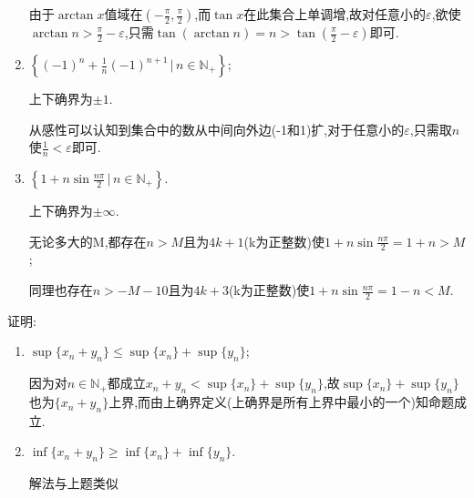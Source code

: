 \documentclass[cn,chinese,fontset]{elegantbook}
\begin{document}
\begin{exercise}
\begin{enumerate}
\begin{solution}
                        由于$\arctan x$值域在$\left(-\frac{\pi}{2},\frac{\pi}{2}\right)$,而$\tan x$在此集合上单调增,故对任意小的$\varepsilon$,欲使$\arctan n>\frac{\pi}{2}-\varepsilon$,只需$\tan(\arctan n)=n>\tan\left(\frac{\pi}{2}-\varepsilon\right)$即可.
            
                    \end{solution}
                    \item $\left\{(-1)^n+\frac{1}{n}(-1)^{n+1}\,\biggl\lvert\, n\in \mathbb{N}_+\right\};$
                    \begin{solution}
                        上下确界为$\pm 1$.
            
                        从感性可以认知到集合中的数从中间向外边(-1和1)扩,对于任意小的$\varepsilon$,只需取$n$使$\frac{1}{n}<\varepsilon$即可.
                    \end{solution}
                    \item $\left\{1+n\sin\frac{n\pi}{2}\,\bigg\lvert\, n\in \mathbb{N}_+\right\}$.
                    \begin{solution}
                        上下确界为$\pm \infty$.
            
                        无论多大的M,都存在$n>M$且为$4k+1$(k为正整数)使$1+n\sin\frac{n\pi}{2}=1+n>M$;
            
                        同理也存在$n>-M-10$且为$4k+3$(k为正整数)使$1+n\sin\frac{n\pi}{2}=1-n<M$.
                    \end{solution}
                \end{enumerate}
            \end{exercise}

            \begin{exercise}
                证明:
                \begin{enumerate}
                    \item $\sup\{x_n+y_n\}\leqslant \sup\{x_n\}+\sup\{y_n\}$;
                    \begin{solution}
                        因为对$n\in \mathbb{N}_+$都成立$x_n+y_n<\sup\{x_n\}+\sup\{y_n\}$,故$\sup\{x_n\}+\sup\{y_n\}$也为$\{x_n+y_n\}$上界,而由上确界定义(上确界是所有上界中最小的一个)知命题成立.
                    \end{solution}
                    \item $\inf\{x_n+y_n\}\geqslant\inf\{x_n\}+\inf\{y_n\}$.
                    \begin{solution}
                        解法与上题类似
                    \end{solution}
                \end{enumerate}
            \end{exercise}
\end{document}
